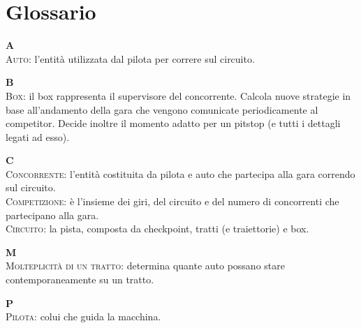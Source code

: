 \section{Glossario}
\begin{list}{}
\item \textbf{A}\\
\textsc{Auto}: l'entit\`{a} utilizzata dal pilota per correre sul circuito.\\
\item \textbf{B}\\
\textsc{Box}: il box rappresenta il supervisore del concorrente. Calcola nuove strategie in base all'andamento della gara che vengono comunicate
periodicamente al competitor. Decide inoltre il momento adatto per un pitstop (e tutti i dettagli legati ad esso).\\
\item \textbf{C}\\
\textsc{Concorrente}: l'entit\`{a} costituita da pilota e auto che partecipa alla gara correndo sul circuito.\\
\textsc{Competizione}: \`{e} l'insieme dei giri, del circuito e del numero di concorrenti che partecipano alla gara.\\
\textsc{Circuito}: la pista, composta da checkpoint, tratti (e traiettorie) e box.\\
\item \textbf{M}\\
\textsc{Molteplicit\`{a} di un tratto}: determina quante auto possano stare contemporaneamente su un tratto.\\
\item \textbf{P}\\
\textsc{Pilota}: colui che guida la macchina.\\

\end{list}
